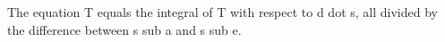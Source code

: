 The equation T equals the integral of T with respect to d dot s, all divided by the difference between s sub a and s sub e.